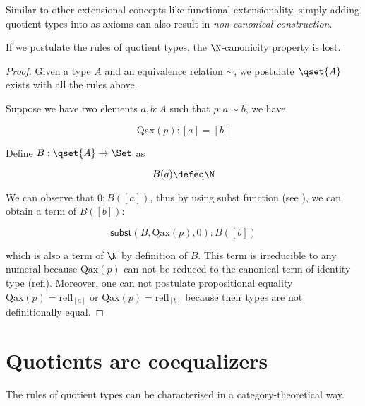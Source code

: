 




Similar to other extensional concepts like functional extensionality, simply adding quotient types into \itt as axioms can also result in \emph{non-canonical construction}.

\begin{theorem}\label{quotientcanonicity}
If we postulate the rules of quotient types, the $\N$-canonicity property is lost.
\end{theorem}

\begin{proof}
Given a type $A$ and an equivalence relation $\sim$, we postulate $\qset{A}$ exists with all the rules above.

Suppose we have two elements $a, b : A$ such that $p : a \sim b$, we have

$$\text{Qax}(p) : [a] = [b]$$

Define $B : \qset{A} \to \Set$ as

$$B(q)\defeq \N$$

We can observe that $0 : B([a])$, thus by using subst function (see ), we can obtain a term of $B([b])$:

$$\mathsf{subst}(B,\text{Qax}(p),0) : B([b])$$

which is also a term of $\N$ by definition of $B$.
This term is irreducible to any numeral because $\text{Qax}(p)$ can not be reduced to the canonical term of identity type (refl). Moreover, one can not postulate propositional equality $\text{Qax}(p) = \text{refl}_{[a]}$ or $\text{Qax}(p) = \text{refl}_{[b]}$ because their types are not definitionally equal.
\end{proof}

\section{Quotients are coequalizers}

The rules of quotient types can be characterised in a category-theoretical way.

